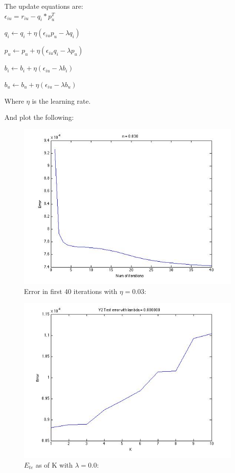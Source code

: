 \documentclass{article}
\begin{document}
The update equations are:\\
$\epsilon_{iu} = r_{iu} - q_i * p_u^T$

$q_i \leftarrow q_i + \eta(\epsilon_{iu}p_u - \lambda q_i)$

$p_u \leftarrow p_u + \eta(\epsilon_{iu}q_i - \lambda p_u)$

$b_i \leftarrow b_i + \eta(\epsilon_{iu} - \lambda b_i)$

$b_u \leftarrow b_u + \eta(\epsilon_{iu} - \lambda b_u)$

Where $\eta$ is the learning rate.

And plot the following:\\

\begin{figure}[H]
\centering
\includegraphics[scale=0.5]{EAsOfK-V2.jpg}
\caption{ Error in first 40 iterations with $\eta=0.03$: }
\label{}
\end{figure}

\begin{figure}[H]
\centering
\includegraphics[scale=0.5]{TestErrorLambda0-V2.jpg}
\caption{ $E_{te}$ as of K with $\lambda=0.0$:}
\label{}
\end{figure}
\end{document}
